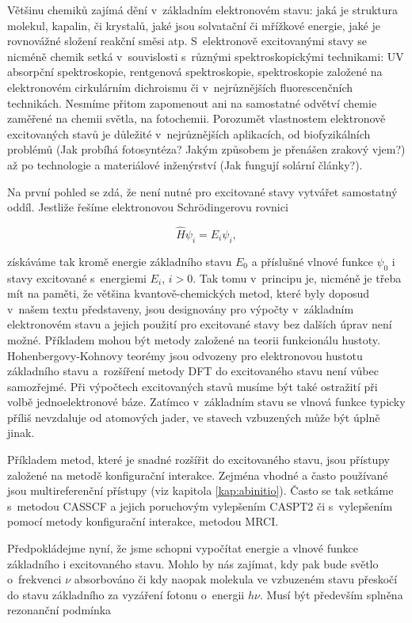 Většinu chemiků zajímá dění v~základním elektronovém stavu: jaká je struktura molekul, kapalin, či krystalů, jaké jsou solvatační či mřížkové energie, jaké je rovnovážné složení reakční směsi atp. S~elektronově excitovanými stavy se nicméně chemik setká v~souvislosti s~různými spektroskopickými technikami: UV absorpční spektroskopie, rentgenová spektroskopie, spektroskopie založené na elektronovém cirkulárním dichroismu či v~nejrůznějších fluorescenčních technikách. Nesmíme přitom zapomenout ani na samostatné odvětví chemie zaměřené na chemii světla, na fotochemii. Porozumět vlastnostem elektronově excitovaných stavů je důležité v~nejrůznějších aplikacích, od biofyzikálních problémů (Jak probíhá fotosyntéza? Jakým  způsobem je přenášen zrakový vjem?) až po technologie a materiálové inženýrství (Jak fungují solární články?). 

Na první pohled se zdá, že není nutné pro excitované stavy vytvářet samostatný oddíl. Jestliže řešíme elektronovou Schr\"odingerovu rovnici

\begin{equation}
\hat{H} \psi_i = E_i \psi_i ,
\label{rov:Ex-1}
\end{equation}

\noindent získáváme tak kromě energie základního stavu $E_0$ a příslušné vlnové funkce $\psi_0$ i stavy excitované s~energiemi $E_i$, $i > 0$. Tak tomu v~principu je, nicméně je třeba mít na paměti, že většina kvantově-chemických metod, které byly doposud v~našem textu představeny, jsou designovány pro výpočty v~základním elektronovém stavu a jejich použití pro excitované stavy bez dalších úprav není možné. Příkladem mohou být metody založené na teorii funkcionálu hustoty. Hohenbergovy-Kohnovy teorémy jsou odvozeny pro elektronovou hustotu základního stavu a~rozšíření metody DFT do excitovaného stavu není vůbec samozřejmé. Při výpočtech excitovaných stavů musíme být také ostražití při volbě jednoelektronové báze. Zatímco v~základním stavu se vlnová funkce typicky příliš nevzdaluje od atomových jader, ve stavech vzbuzených může být úplně jinak.  

Příkladem metod, které je snadné rozšířit do excitovaného stavu, jsou přístupy založené na metodě konfigurační interakce. Zejména vhodné a často používané jsou multireferenční přístupy (viz kapitola \ref{kap:abinitio}). Často se tak setkáme s~metodou CASSCF a jejich poruchovým  vylepšením CASPT2 či s~vylepšením pomocí metody konfigurační interakce, metodou MRCI.   

Předpokládejme nyní, že jsme schopni vypočítat energie a vlnové funkce základního i excitovaného stavu. Mohlo by nás zajímat, kdy pak bude světlo o~frekvenci $\nu$ absorbováno či kdy naopak molekula ve vzbuzeném stavu přeskočí do stavu základního za vyzáření fotonu o~energii $h\nu$. Musí být především splněna rezonanční podmínka 


